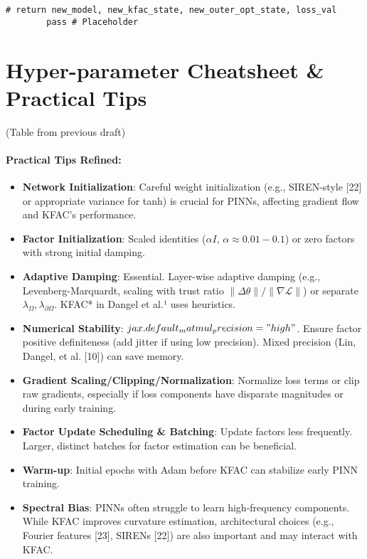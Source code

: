 \documentclass[12pt,a4paper]{article}
\begin{document}
\begin{lstlisting}[caption={Further conceptual details for KFAC in JAX + Equinox.},label=lst:kfac_jax_conceptual]
        # return new_model, new_kfac_state, new_outer_opt_state, loss_val
        pass # Placeholder
\end{lstlisting}
\vspace{-5pt}

\section{Hyper-parameter Cheatsheet \& Practical Tips}
(Table from previous draft)
\paragraph{Practical Tips Refined:}
\begin{itemize}[nosep,leftmargin=*]
\item \textbf{Network Initialization}: Careful weight initialization (e.g., SIREN-style [22] or appropriate variance for tanh) is crucial for PINNs, affecting gradient flow and KFAC's performance.
\item \textbf{Factor Initialization}: Scaled identities (\(\alpha I\), \(\alpha \approx 0.01-0.1\)) or zero factors with strong initial damping.
\item \textbf{Adaptive Damping}: Essential. Layer-wise adaptive damping (e.g., Levenberg-Marquardt, scaling with trust ratio \(\|\Delta\theta\|/\|\nabla\mathcal{L}\|\)) or separate \(\lambda_\Omega, \lambda_{\partial\Omega}\). KFAC* in Dangel et al.¹ uses heuristics.
\item \textbf{Numerical Stability}: $jax.default_matmul_precision="high"$. Ensure factor positive definiteness (add jitter if using low precision). Mixed precision (Lin, Dangel, et al. [10]) can save memory.
\item \textbf{Gradient Scaling/Clipping/Normalization}: Normalize loss terms or clip raw gradients, especially if loss components have disparate magnitudes or during early training.
\item \textbf{Factor Update Scheduling \& Batching}: Update factors less frequently. Larger, distinct batches for factor estimation can be beneficial.
\item \textbf{Warm-up}: Initial epochs with Adam before KFAC can stabilize early PINN training.
\item \textbf{Spectral Bias}: PINNs often struggle to learn high-frequency components. While KFAC improves curvature estimation, architectural choices (e.g., Fourier features [23], SIRENs [22]) are also important and may interact with KFAC.
\end{itemize}
\end{document}
